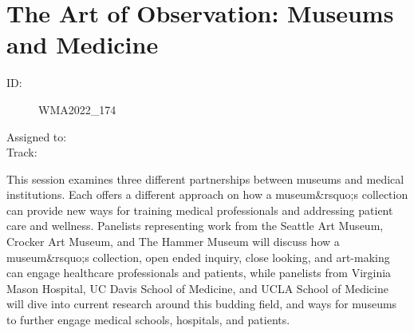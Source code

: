 \documentclass{report}
\begin{document}
        
          \newpage
          \section{ The Art of Observation: Museums and Medicine }
            \begin{description}
              \item [ID:]
              WMA2022\_174

              \item [Assigned to:]
                \item [Track:]
              \end{description}

              This session examines three different partnerships between museums and medical institutions. Each offers a different approach on how a museum\&rsquo;s collection can provide new ways for training medical professionals and addressing patient care and wellness. Panelists representing work from the  Seattle Art Museum, Crocker Art Museum, and The Hammer Museum will discuss how a museum\&rsquo;s collection, open ended inquiry, close looking, and art-making can engage healthcare professionals and patients, while panelists from Virginia Mason Hospital, UC Davis School of Medicine, and UCLA School of Medicine will dive into current research around this budding field, and ways for museums to further engage medical schools, hospitals, and patients.
\end{document}
